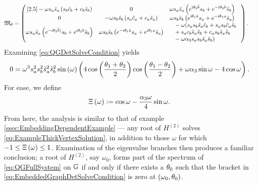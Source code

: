 \begin{align*}
	\mathfrak{M}_{\theta} &=
	\begin{pmatrix}[2.5]
		-\omega s_a \tilde{s}_a \left(  s_b \tilde{c}_b + c_b \tilde{s}_b  \right) &
		0 &
		\begin{split}
			&\omega s_a \tilde{s}_a \left(  e^{\mathrm{i}\theta_2\tilde{b}}s_b + e^{-\mathrm{i}\theta_2 b}\tilde{s}_b  \right)
		\end{split} \\
		0 &
		-\omega s_b \tilde{s}_b \left(  s_a \tilde{c}_a + c_a \tilde{s}_a  \right) &
		\begin{split}
			&\omega s_b \tilde{s}_b \left(  e^{\mathrm{i}\theta_1\tilde{a}}s_a + e^{-\mathrm{i}\theta_1 a}\tilde{s}_a  \right) 
		\end{split} \\
		\omega s_a \tilde{s}_a \left(  e^{-\mathrm{i}\theta_2\tilde{b})}s_b + e^{\mathrm{i}\theta_2 b}\tilde{s}_b  \right) &
		\omega s_b \tilde{s}_b \left(  e^{-\mathrm{i}\theta_1\tilde{a}}s_a + e^{\mathrm{i}\theta_1 a}\tilde{s}_a  \right) &
		\begin{split}
			&-\omega ( s_a s_b \tilde{s}_a \tilde{c}_b 
			+ s_a s_b \tilde{c}_a \tilde{s}_b \\ 
			& + s_a c_b \tilde{s}_a \tilde{s}_b
			+ c_a s_b \tilde{s}_a \tilde{s}_b \\
			& - \omega\alpha_3 s_a s_b \tilde{s}_a \tilde{s}_b )
		\end{split}
	\end{pmatrix}.
\end{align*}
Examining \eqref{eq:QGDetSolveCondition} yields
\begin{align} \label{eq:ExampleThickVertexSolution}
	0 = \omega^3 s_a^2 s_b^2 \tilde{s}_a^2 \tilde{s}_b^2 \sin\left( \omega \right) 
	\left(  4\cos\left( \frac{\theta_1+\theta_2}{2} \right)\cos\left( \frac{\theta_1-\theta_2}{2} \right) + \omega\alpha_3\sin\omega - 4\cos\omega \right).
\end{align}
For ease, we define
\begin{align*}
	\Xi\left( \omega \right) := \cos\omega - \frac{\alpha_3\omega}{4}\sin\omega.
\end{align*}
From here, the analysis is similar to that of example \ref{ssec:EmbeddingDependentExample} --- any root of $H^{(2)}$ solves \eqref{eq:ExampleThickVertexSolution}, in addition to those $\omega$ for which $-1\leq\Xi\left( \omega \right)\leq 1$.
Examination of the eigenvalue branches then produces a familiar conclusion; a root of $H^{(2)}$, say $\omega_0$, forms part of the spectrum of \eqref{eq:QGFullSystem} on $\mathbb{G}$ if and only if there exists a $\theta_0$ such that the bracket in \eqref{eq:EmbeddedGraphDetSolveCondition} is zero at $\left( \omega_0,\theta_0 \right)$.
